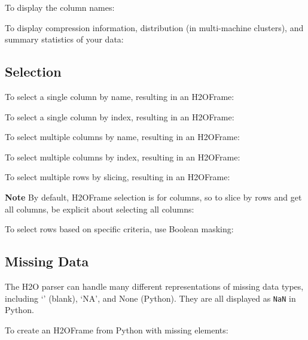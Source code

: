 {To display the column names:


To display compression information, distribution (in multi-machine clusters), and summary statistics of your data:





\subsection{Selection}
To select a single column by name, resulting in an H2OFrame:


To select a single column by index, resulting in an H2OFrame:


\newpage
To select multiple columns by name, resulting in an H2OFrame:


To select multiple columns by index, resulting in an H2OFrame:


To select multiple rows by slicing, resulting in an H2OFrame: 

\textbf{Note} By default, H2OFrame selection is for columns, so to slice by rows
and get all columns, be explicit about selecting all columns:


To select rows based on specific criteria, use Boolean masking:



\subsection{Missing Data}
The H2O parser can handle many different representations of missing data types, including `' (blank),
`NA',  and None (Python).  They are all displayed as \texttt{NaN} in Python.

To create an H2OFrame from Python with missing elements:


}
